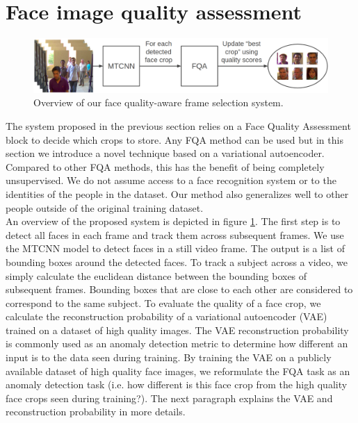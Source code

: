 \documentclass[letterpaper]{article} %
\begin{document}
\section{Face image quality assessment}
\label{section:approach}
\begin{figure}[t]
\centering
\includegraphics[width=\linewidth]{figures/FQA_overview.png}
\caption{Overview of our face quality-aware frame selection system.}
\label{fig:fqa_overview}
\end{figure}
The system proposed in the previous section relies on a Face Quality Assessment block to decide which crops to store. Any FQA method can be used but in this section we introduce a novel technique based on a variational autoencoder. Compared to other FQA methods, this has the benefit of being completely unsupervised. We do not assume access to a face recognition system or to the identities of the people in the dataset. Our method also generalizes well to other people outside of the original training dataset.
\\
\newline
An overview of the proposed system is depicted in figure \ref{fig:fqa_overview}. The first step is to detect all faces in each frame and track them across subsequent frames. We use the MTCNN model \cite{zhang2016joint} to detect faces in a still video frame. The output is a list of bounding boxes around the detected faces. To track a subject across a video, we simply calculate the euclidean distance between the bounding boxes of subsequent frames. Bounding boxes that are close to each other are considered to correspond to the same subject. To evaluate the quality of a face crop, we calculate the reconstruction probability of a variational autoencoder (VAE) trained on a dataset of high quality images. The VAE reconstruction probability is commonly used as an anomaly detection metric \cite{an2015variational} to determine how different an input is to the data seen during training. By training the VAE on a publicly available dataset of high quality face images, we reformulate the FQA task as an anomaly detection task (i.e. how different is this face crop from the high quality face crops seen during training?). The next paragraph explains the VAE and reconstruction probability in more details.
\end{document}
